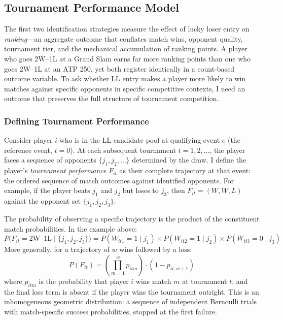 \subsection{Tournament Performance Model}
\label{sec:strategy_tournament}

The first two identification strategies measure the effect of lucky loser entry on \emph{ranking}---an aggregate outcome that conflates match wins, opponent quality, tournament tier, and the mechanical accumulation of ranking points. A player who goes 2W--1L at a Grand Slam earns far more ranking points than one who goes 2W--1L at an ATP 250, yet both register identically in a count-based outcome variable. To ask whether LL entry makes a player more likely to win matches against specific opponents in specific competitive contexts, I need an outcome that preserves the full structure of tournament competition.

\subsubsection{Defining Tournament Performance}

Consider player $i$ who is in the LL candidate pool at qualifying event $e$ (the reference event, $t = 0$). At each subsequent tournament $t = 1, 2, \ldots$, the player faces a sequence of opponents $\{j_1, j_2, \ldots\}$ determined by the draw. I define the player's \textit{tournament performance} $F_{it}$ as their complete trajectory at that event: the ordered sequence of match outcomes against identified opponents. For example, if the player beats $j_1$ and $j_2$ but loses to $j_3$, then $F_{it} = (W, W, L)$ against the opponent set $\{j_1, j_2, j_3\}$.

The probability of observing a specific trajectory is the product of the constituent match probabilities. In the example above:
\begin{equation}
\label{eq:tournament_performance}
P\bigl(F_{it} = \text{2W--1L} \mid \{j_1, j_2, j_3\}\bigr) = P(W_{it1} = 1 \mid j_1) \times P(W_{it2} = 1 \mid j_2) \times P(W_{it3} = 0 \mid j_3)
\end{equation}
More generally, for a trajectory of $w$ wins followed by a loss:
\begin{equation}
\label{eq:sequential_likelihood}
P(F_{it}) = \left(\prod_{m=1}^{w} p_{itm}\right) \cdot \left(1 - p_{it,w+1}\right)
\end{equation}
where $p_{itm}$ is the probability that player $i$ wins match $m$ at tournament $t$, and the final loss term is absent if the player wins the tournament outright. This is an inhomogeneous geometric distribution: a sequence of independent Bernoulli trials with match-specific success probabilities, stopped at the first failure.

